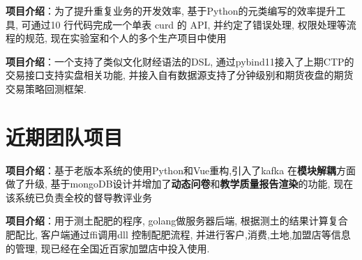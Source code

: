 \documentclass{resume}
\begin{document}
\begin{onehalfspacing}
\textbf{项目介绍}：\quad 为了提升重复业务的开发效率, 基于Python的元类编写的效率提升工具, 可通过10 行代码完成一个单表 curd 的 API, 并约定了错误处理, 权限处理等流程的规范, 现在实验室和个人的多个生产项目中使用
\end{onehalfspacing}

\begin{onehalfspacing}
\textbf{项目介绍}：\quad  一个支持了类似文化财经语法的DSL, 通过pybind11接入了上期CTP的交易接口支持实盘相关功能, 并接入自有数据源支持了分钟级别和期货夜盘的期货交易策略回测框架. 
\end{onehalfspacing} 

\section{\faObjectGroup 近期团队项目}
\begin{onehalfspacing}
  \textbf{项目介绍}：\quad 基于老版本系统的使用Python和Vue重构,引入了kafka 在\textbf{模块解耦}方面做了升级, 基于mongoDB设计并增加了\textbf{动态问卷}和\textbf{教学质量报告渲染}的功能, 现在该系统已负责全校的督导教评业务
\end{onehalfspacing}
\begin{onehalfspacing}
  \textbf{项目介绍}：\quad 用于测土配肥的程序, golang做服务器后端, 根据测土的结果计算复合肥配比, 客户端通过ffi调用dll 控制配肥流程,  并进行客户,消费,土地,加盟店等信息的管理, 现已经在全国近百家加盟店中投入使用.
\end{onehalfspacing}
\end{document}
